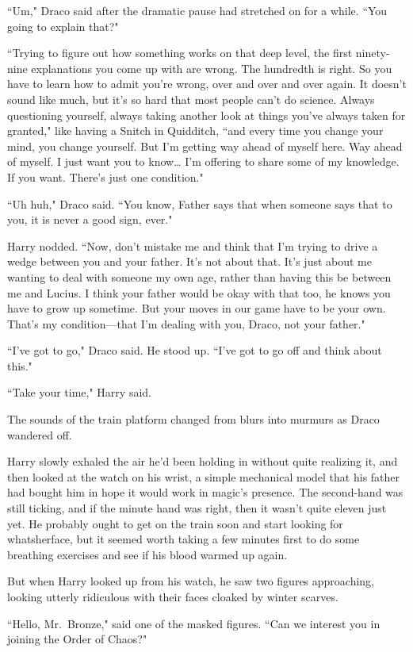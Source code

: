 ``Um," Draco said after the dramatic pause had stretched on for a while. ``You going to explain that?"

``Trying to figure out how something works on that deep level, the first ninety-nine explanations you come up with are wrong. The hundredth is right. So you have to learn how to admit you're wrong, over and over and over again. It doesn't sound like much, but it's so hard that most people can't do science. Always questioning yourself, always taking another look at things you've always taken for granted," like having a Snitch in Quidditch, ``and every time you change your mind, you change yourself. But I'm getting way ahead of myself here. Way ahead of myself. I just want you to know{\ldots} I'm offering to share some of my knowledge. If you want. There's just one condition."

``Uh huh," Draco said. ``You know, Father says that when someone says that to you, it is never a good sign, ever."

Harry nodded. ``Now, don't mistake me and think that I'm trying to drive a wedge between you and your father. It's not about that. It's just about me wanting to deal with someone my own age, rather than having this be between me and Lucius. I think your father would be okay with that too, he knows you have to grow up sometime. But your moves in our game have to be your own. That's my condition—that I'm dealing with you, Draco, not your father."

``I've got to go," Draco said. He stood up. ``I've got to go off and think about this."

``Take your time," Harry said.

The sounds of the train platform changed from blurs into murmurs as Draco wandered off.

Harry slowly exhaled the air he'd been holding in without quite realizing it, and then looked at the watch on his wrist, a simple mechanical model that his father had bought him in hope it would work in magic's presence. The second-hand was still ticking, and if the minute hand was right, then it wasn't quite eleven just yet. He probably ought to get on the train soon and start looking for whatsherface, but it seemed worth taking a few minutes first to do some breathing exercises and see if his blood warmed up again.

But when Harry looked up from his watch, he saw two figures approaching, looking utterly ridiculous with their faces cloaked by winter scarves.

``Hello, Mr.~Bronze," said one of the masked figures. ``Can we interest you in joining the Order of Chaos?"

